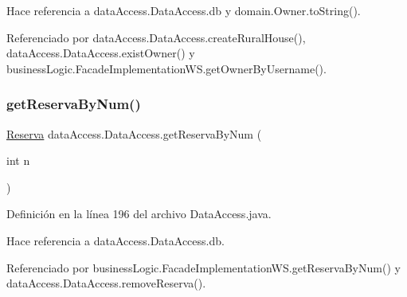 Hace referencia a data\+Access.\+Data\+Access.\+db y domain.\+Owner.\+to\+String().



Referenciado por data\+Access.\+Data\+Access.\+create\+Rural\+House(), data\+Access.\+Data\+Access.\+exist\+Owner() y business\+Logic.\+Facade\+Implementation\+W\+S.\+get\+Owner\+By\+Username().

\mbox{\label{classdata_access_1_1_data_access_ad2661c3e2d7e0550b837b2763456683d}} 
\subsubsection{\texorpdfstring{getReservaByNum()}{getReservaByNum()}}
{\footnotesize\ttfamily \mbox{\hyperlink{classdomain_1_1_reserva}{Reserva}} data\+Access.\+Data\+Access.\+get\+Reserva\+By\+Num (\begin{DoxyParamCaption}\item[{int}]{n }\end{DoxyParamCaption})}



Definición en la línea 196 del archivo Data\+Access.\+java.


\begin{DoxyCode}{0}

\end{DoxyCode}


Hace referencia a data\+Access.\+Data\+Access.\+db.



Referenciado por business\+Logic.\+Facade\+Implementation\+W\+S.\+get\+Reserva\+By\+Num() y data\+Access.\+Data\+Access.\+remove\+Reserva().

\mbox{\label{classdata_access_1_1_data_access_a8addeaaedd74ad2fb8e285672c22d216}} 
